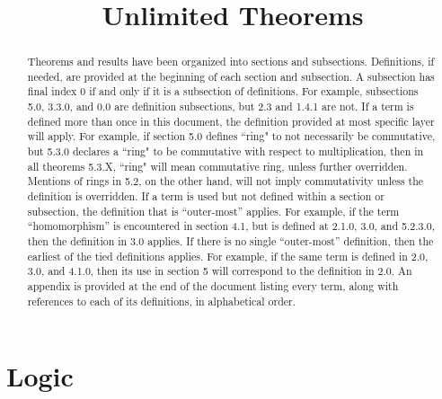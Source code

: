 \documentclass{article}
\title{Unlimited Theorems}
\date{}
\theoremstyle{definition}
\theoremstyle{theorem}
\begin{document}
\maketitle
\begin{abstract}
    \noindent
    Theorems and results have been organized into sections and subsections. Definitions, if needed, are provided at the beginning of each section and subsection. A subsection has final index 0 if and only if it is a subsection of definitions. For example, subsections 5.0, 3.3.0, and 0.0 are definition subsections, but 2.3 and 1.4.1 are not.
    \newline
    \newline
    \noindent    
    If a term is defined more than once in this document, the definition provided at most specific layer will apply. For example, if section 5.0 defines ``ring" to not necessarily be commutative, but 5.3.0 declares a ``ring" to be commutative with respect to multiplication, then in all theorems 5.3.X, ``ring" will mean commutative ring, unless further overridden. Mentions of rings in 5.2, on the other hand, will not imply commutativity unless the definition is overridden.
    \newline
    \newline
    \noindent
    If a term is used but not defined within a section or subsection, the definition that is ``outer-most'' applies. For example, if the term ``homomorphism'' is encountered in section 4.1, but is defined at 2.1.0, 3.0, and 5.2.3.0, then the definition in 3.0 applies. If there is no single ``outer-most'' definition, then the earliest of the tied definitions applies. For example, if the same term is defined in 2.0, 3.0, and 4.1.0, then its use in section 5 will correspond to the definition in 2.0.
    \newline
    \newline
    \noindent
    An appendix is provided at the end of the document listing every term, along with references to each of its definitions, in alphabetical order.

\end{abstract}
\newpage

\tableofcontents





\newpage

\section{Logic}
\end{document}
